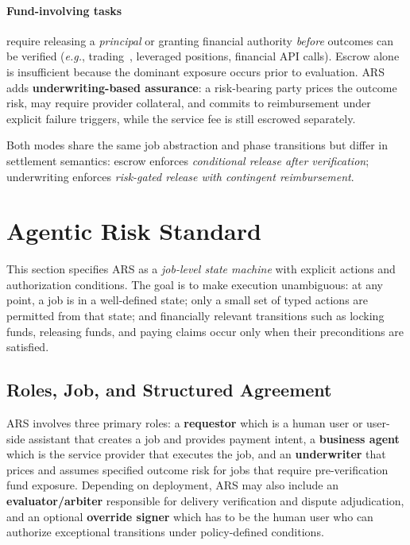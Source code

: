 \documentclass{article} %
\begin{document}
\paragraph{Fund-involving tasks} require releasing a \emph{principal} or granting financial authority \emph{before} outcomes can be verified (\emph{e.g.}, trading~\citep{xiao2024tradingagents, ding2024large, yu2025finmem, li2024cryptotrade, qian2025agents}, leveraged positions, financial API calls). Escrow alone is insufficient because the dominant exposure occurs prior to evaluation. \textsc{ARS} adds \textbf{underwriting-based assurance}: a risk-bearing party prices the outcome risk, may require provider collateral, and commits to reimbursement under explicit failure triggers, while the service fee is still escrowed separately.

Both modes share the same job abstraction and phase transitions but differ in settlement semantics: escrow enforces \emph{conditional release after verification}; underwriting enforces \emph{risk-gated release with contingent reimbursement}.





\section{Agentic Risk Standard}

This section specifies \textsc{ARS} as a \emph{job-level state machine} with explicit actions and authorization conditions. The goal is to make execution unambiguous: at any point, a job is in a well-defined state; only a small set of typed actions are permitted from that state; and financially relevant transitions such as locking funds, releasing funds, and paying claims occur only when their preconditions are satisfied.

\subsection{Roles, Job, and Structured Agreement}

\textsc{ARS} involves three primary roles: a \textbf{requestor} which is a human user or user-side assistant that creates a job and provides payment intent, a \textbf{business agent} which is the service provider that executes the job, and an \textbf{underwriter} that prices and assumes specified outcome risk for jobs that require pre-verification fund exposure. Depending on deployment, \textsc{ARS} may also include an \textbf{evaluator/arbiter} responsible for delivery verification and dispute adjudication, and an optional \textbf{override signer} which has to be the human user who can authorize exceptional transitions under policy-defined conditions.
\end{document}
